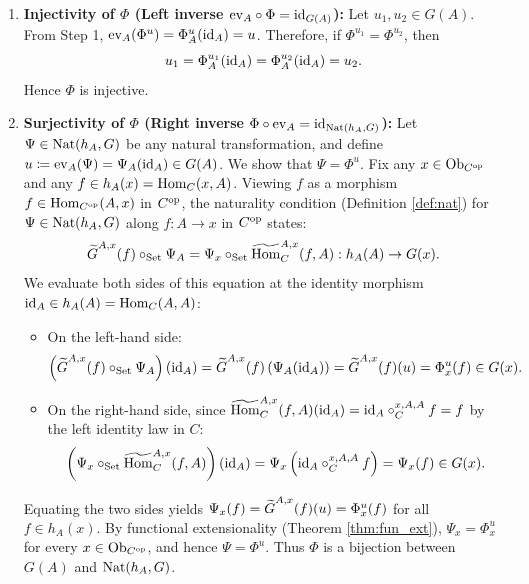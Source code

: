 \documentclass[10pt,a4paper]{article}
\begin{document}
\begin{enumerate}
\item \textbf{Injectivity of $\Phi$ (Left inverse $\mathrm{ev}_A \circ \Phi = {\textrm{id}}_{G(A)}$):}
Let $u_1, u_2 \in G(A)$. From Step 1, $\mathrm{ev}_A(\Phi^u) = \Phi^u_A({\textrm{id}}_A) = u$. Therefore, if $\Phi^{u_1} = \Phi^{u_2}$, then
$$u_1 = \Phi^{u_1}_A({\textrm{id}}_A) = \Phi^{u_2}_A({\textrm{id}}_A) = u_2.$$
Hence $\Phi$ is injective.

\item \textbf{Surjectivity of $\Phi$ (Right inverse $\Phi \circ \mathrm{ev}_A = {\textrm{id}}_{{\textrm{Nat}}(h_A,G)}$):}
Let $\Psi \in {\textrm{Nat}}(h_A, G)$ be any natural transformation, and define $u \coloneqq \mathrm{ev}_A(\Psi) = \Psi_A({\textrm{id}}_A) \in G(A)$. We show that $\Psi = \Phi^u$.
Fix any $x \in {\textrm{Ob}}_{C^{\textrm{op}}}$ and any $f \in h_A(x) = {\textrm{Hom}}_C(x,A)$. Viewing $f$ as a morphism $f \in {\textrm{Hom}}_{C^{\textrm{op}}}(A,x)$ in $C^{\textrm{op}}$, the naturality condition (Definition \ref{def:nat}) for $\Psi \in {\textrm{Nat}}(h_A, G)$ along $f : A \to x$ in $C^{\textrm{op}}$ states:
$${\widetilde{G}\textrm{}}^{A,x}(f) \circ_{\textrm{Set}} \Psi_A = \Psi_x \circ_{\textrm{Set}} {\widetilde{{\textrm{Hom}}}\textrm{}}_C^{A,x}(f,A) : h_A(A) \to G(x).$$
We evaluate both sides of this equation at the identity morphism ${\textrm{id}}_A \in h_A(A) = {\textrm{Hom}}_C(A,A)$:
\begin{itemize}
\item On the left-hand side:
$$\left({\widetilde{G}\textrm{}}^{A,x}(f) \circ_{\textrm{Set}} \Psi_A\right)({\textrm{id}}_A) = {\widetilde{G}\textrm{}}^{A,x}(f)\left(\Psi_A({\textrm{id}}_A)\right) = {\widetilde{G}\textrm{}}^{A,x}(f)(u) = \Phi^u_x(f) \in G(x).$$
\item On the right-hand side, since ${\widetilde{{\textrm{Hom}}}\textrm{}}_C^{A,x}(f,A)({\textrm{id}}_A) = {\textrm{id}}_A \circ_C^{x,A,A} f = f$ by the left identity law in $C$:
$$\left(\Psi_x \circ_{\textrm{Set}} {\widetilde{{\textrm{Hom}}}\textrm{}}_C^{A,x}(f,A)\right)({\textrm{id}}_A) = \Psi_x\left({\textrm{id}}_A \circ_C^{x,A,A} f\right) = \Psi_x(f) \in G(x).$$
\end{itemize}
Equating the two sides yields $\Psi_x(f) = {\widetilde{G}\textrm{}}^{A,x}(f)(u) = \Phi^u_x(f)$ for all $f \in h_A(x)$.
By functional extensionality (Theorem \ref{thm:fun_ext}), $\Psi_x = \Phi^u_x$ for every $x \in {\textrm{Ob}}_{C^{\textrm{op}}}$, and hence $\Psi = \Phi^u$. Thus $\Phi$ is a bijection between $G(A)$ and ${\textrm{Nat}}(h_A, G)$.
\end{enumerate}
\myqed
\end{document}
